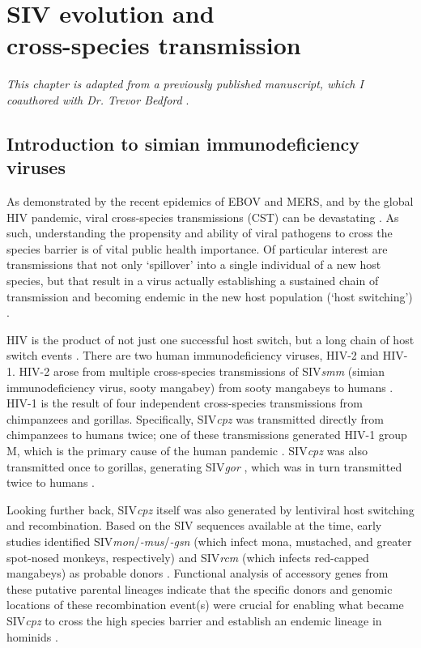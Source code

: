 
\chapter{SIV evolution and\\cross-species transmission}
\textit{This chapter is adapted from a previously published manuscript, which I coauthored with Dr. Trevor Bedford} \citep{bell2017modern,bell2017thesis}.

\section{Introduction to simian immunodeficiency viruses}
As demonstrated by the recent epidemics of EBOV and MERS, and by the global HIV pandemic, viral cross-species transmissions (CST) can be devastating \citep{morens2008emerging,parrish2008cross}.
As such, understanding the propensity and ability of viral pathogens to cross the species barrier is of vital public health importance.
Of particular interest are transmissions that not only `spillover' into a single individual of a new host species, but that result in a virus actually establishing a sustained chain of transmission and becoming endemic in the new host population (`host switching') \citep{locatelli2012cross}.

HIV is the product of not just one successful host switch, but a long chain of host switch events \citep{apetrei2004history,sharp2011origins}.
There are two human immunodeficiency viruses, HIV-2 and HIV-1.
HIV-2 arose from multiple cross-species transmissions of SIV\textit{smm} (simian immunodeficiency virus, sooty mangabey) from sooty mangabeys to humans \citep{chen1996genetic,gao1992human,hirsch1989african}.
HIV-1 is the result of four independent cross-species transmissions from chimpanzees and gorillas.
Specifically, SIV\textit{cpz} was transmitted directly from chimpanzees to humans twice; one of these transmissions generated HIV-1 group M, which is the primary cause of the human pandemic \citep{gao1999origin}.
SIV\textit{cpz} was also transmitted once to gorillas, generating SIV\textit{gor} \citep{van2006human}, which was in turn transmitted twice to humans \citep{d2015origin}.

Looking further back, SIV\textit{cpz} itself was also generated by lentiviral host switching and recombination.
Based on the SIV sequences available at the time, early studies identified SIV\textit{mon}/\textit{-mus}/\textit{-gsn} (which infect mona, mustached, and greater spot-nosed monkeys, respectively) and SIV\textit{rcm} (which infects red-capped mangabeys) as probable donors \citep{bailes2003hybrid}.
Functional analysis of accessory genes from these putative parental lineages indicate that the specific donors and genomic locations of these recombination event(s) were crucial for enabling what became SIV\textit{cpz} to cross the high species barrier and establish an endemic lineage in hominids \citep{etienne2013gene}.

